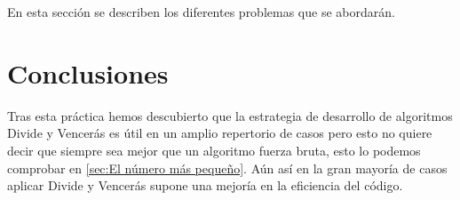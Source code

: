 \documentclass[a4paper,12pt]{article}
\begin{document}
En esta sección se describen los diferentes problemas que se abordarán.

\section{Conclusiones}
Tras esta práctica hemos descubierto que la estrategia de desarrollo de algoritmos Divide y Vencerás 
es útil en un amplio repertorio de casos pero esto no quiere decir que siempre sea mejor que un algoritmo 
fuerza bruta, esto lo podemos comprobar en \ref{sec:El número más pequeño}. Aún así en la gran mayoría de casos aplicar Divide y Vencerás 
supone una mejoría en la eficiencia del código.
\end{document}
